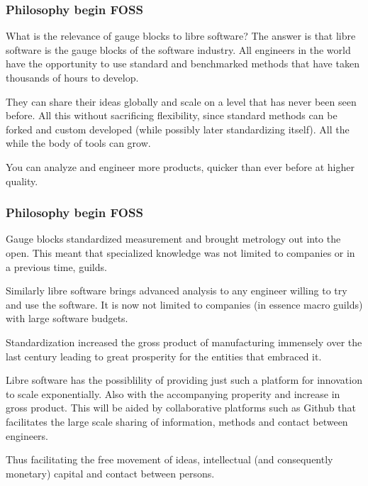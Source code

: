 \documentclass{beamer}
\begin{document}
\begin{frame}
\frametitle{Philosophy begin FOSS}

What is the relevance of gauge blocks to libre software?
The answer is that libre software is the gauge blocks of the software industry.
All engineers in the world have the opportunity to use standard and benchmarked methods that have taken thousands of hours to develop.

They can share their ideas globally and scale on a level that has never been seen before.
All this without sacrificing flexibility, since standard methods can be forked and custom developed (while possibly later standardizing itself).  All the while the body of tools can grow.

You can analyze and engineer more products, quicker than ever before at higher quality.

\end{frame}

\begin{frame}
\frametitle{Philosophy begin FOSS}

Gauge blocks standardized measurement and brought metrology out into the open.  This meant that specialized knowledge was not limited to companies or in a previous time, guilds.

Similarly libre software brings advanced analysis to any engineer willing to try and use the software.  It is now not limited to companies (in essence macro guilds) with large software budgets.

Standardization increased the gross product of manufacturing immensely over the last century leading to great prosperity for the entities that embraced it.

Libre software has the possiblility of providing just such a platform for innovation to scale exponentially.  Also with the accompanying properity and increase in gross product.
This will be aided by collaborative platforms such as Github that facilitates the large scale sharing of information, methods and contact between engineers.

Thus facilitating the free movement of ideas, intellectual (and consequently monetary) capital and contact between persons.

\end{frame}
\end{document}
